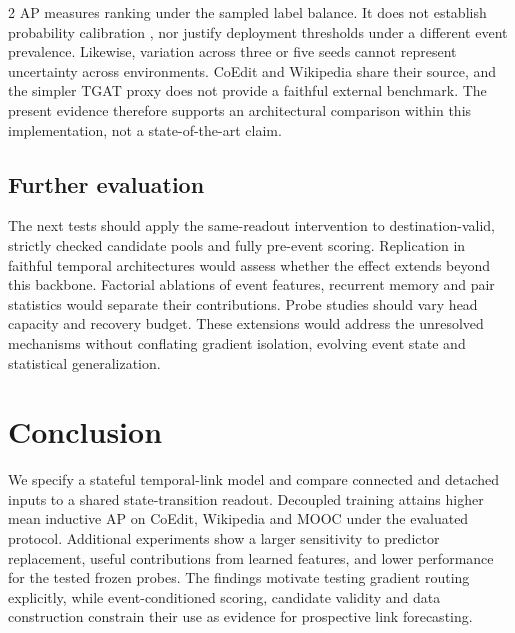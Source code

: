 \documentclass[a4paper,10pt,fleqn]{article}
\begin{document}
\begin{multicols}{2}
AP measures ranking under the sampled label balance. It does not establish probability calibration \cite{calibration}, nor justify deployment thresholds under a different event prevalence. Likewise, variation across three or five seeds cannot represent uncertainty across environments. CoEdit and Wikipedia share their source, and the simpler TGAT proxy does not provide a faithful external benchmark. The present evidence therefore supports an architectural comparison within this implementation, not a state-of-the-art claim.

\subsection{Further evaluation}
The next tests should apply the same-readout intervention to destination-valid, strictly checked candidate pools and fully pre-event scoring. Replication in faithful temporal architectures would assess whether the effect extends beyond this backbone. Factorial ablations of event features, recurrent memory and pair statistics would separate their contributions. Probe studies should vary head capacity and recovery budget. These extensions would address the unresolved mechanisms without conflating gradient isolation, evolving event state and statistical generalization.

\section{Conclusion}
We specify a stateful temporal-link model and compare connected and detached inputs to a shared state-transition readout. Decoupled training attains higher mean inductive AP on CoEdit, Wikipedia and MOOC under the evaluated protocol. Additional experiments show a larger sensitivity to predictor replacement, useful contributions from learned features, and lower performance for the tested frozen probes. The findings motivate testing gradient routing explicitly, while event-conditioned scoring, candidate validity and data construction constrain their use as evidence for prospective link forecasting.


\end{multicols}
\end{document}
